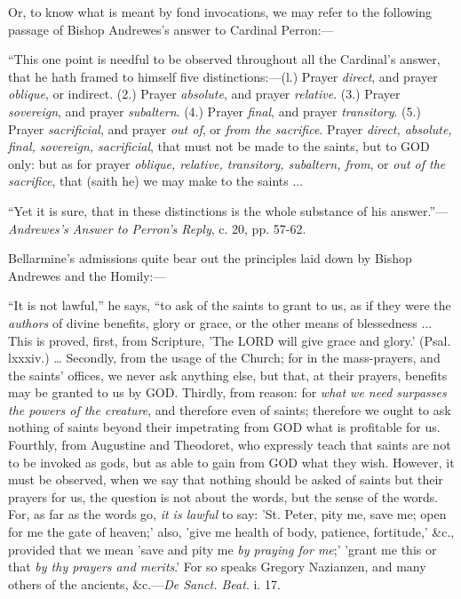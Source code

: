 Or, to know what is meant by fond invocations, we may refer to the
following passage of Bishop Andrewes's answer to Cardinal Perron:—

``This one point is needful to be observed
throughout all the Cardinal's answer, that he hath framed to himself
five distinctions:—(l.) Prayer \emph{direct}, and prayer \emph{oblique},
or indirect. (2.) Prayer \emph{absolute}, and prayer \emph{relative}.
(3.) Prayer \emph{sovereign}, and prayer \emph{subaltern}. (4.) Prayer
\emph{final}, and prayer \emph{transitory}. (5.) Prayer \emph{sacrificial},
and prayer \emph{out of}, or \emph{from the sacrifice}. Prayer \emph{direct,
absolute, final, sovereign, sacrificial}, that must not be made to
the saints, but to GOD
only: but as for prayer \emph{oblique, relative, transitory, subaltern,
from}, or \emph{out of the sacrifice}, that (saith he) we may make
to the saints ...

``Yet it is sure, that in these distinctions is
the whole substance of his answer.''—\emph{Andrewes's Answer to
Perron's Reply}, c. 20, pp. 57-62.

Bellarmine's admissions quite bear out the principles laid down by
Bishop Andrewes and the Homily:—

``It is not lawful,'' he says, ``to ask
of the saints to grant to us, as if they were the \emph{authors} of
divine benefits, glory or grace, or the other means of blessedness ...
This is proved, first, from Scripture, 'The LORD
will give grace and glory.' (Psal. lxxxiv.) … Secondly, from the
usage of the Church; for in the mass-prayers, and the saints'
offices, we never ask anything else, but that, at their prayers,
benefits may be granted to us by GOD.
Thirdly, from reason: for \emph{what we need surpasses the powers of the
creature}, and therefore even of saints; therefore we ought to ask
nothing of saints beyond their impetrating from GOD
what is profitable for us. Fourthly, from Augustine and Theodoret, who
expressly teach that saints are not to be invoked as gods, but as able
to gain from GOD what they
wish. However, it must be observed, when we say that nothing should be
asked of saints but their prayers for us, the question is not about
the words, but the sense of the words. For, as far as the words go, \emph{it
is lawful} to say: 'St. Peter, pity me, save me; open for me the
gate of heaven;' also, 'give me health of body, patience, fortitude,'
\&c., provided that we mean 'save and pity me \emph{by praying for me};'
'grant me this or that \emph{by thy prayers and merits}.' For so
speaks Gregory Nazianzen, and many others of the ancients, \&c.—\emph{De
Sanct. Beat}. i. 17.


